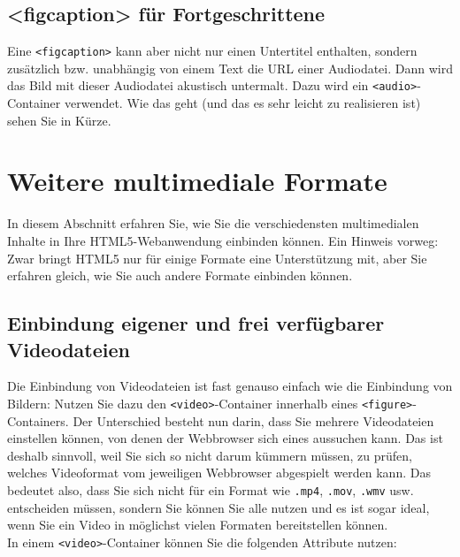 \subsection{<figcaption> für Fortgeschrittene}

Eine \verb|<figcaption>| kann aber nicht nur einen Untertitel enthalten, sondern zusätzlich bzw. unabhängig von einem Text die URL einer Audiodatei. Dann wird das Bild mit dieser Audiodatei akustisch untermalt. Dazu wird ein \verb|<audio>|-Container verwendet. Wie das geht (und das es sehr leicht zu realisieren ist) sehen Sie in Kürze.

\section{Weitere multimediale Formate}

In diesem Abschnitt erfahren Sie, wie Sie die verschiedensten multimedialen Inhalte in Ihre HTML5-Webanwendung einbinden können. Ein Hinweis vorweg: Zwar bringt HTML5 nur für einige Formate eine Unterstützung mit, aber Sie erfahren gleich, wie Sie auch andere Formate einbinden können.

\subsection{Einbindung eigener und frei verfügbarer Videodateien}

Die Einbindung von Videodateien ist fast genauso einfach wie die Einbindung von Bildern: Nutzen Sie dazu den \verb|<video>|-Container innerhalb eines \verb|<figure>|-Containers. Der Unterschied besteht nun darin, dass Sie mehrere Videodateien einstellen können, von denen der Webbrowser sich eines aussuchen kann. Das ist deshalb sinnvoll, weil Sie sich so nicht darum kümmern müssen, zu prüfen, welches Videoformat vom jeweiligen Webbrowser abgespielt werden kann. Das bedeutet also, dass Sie sich nicht für ein Format wie \verb|.mp4|, \verb|.mov|, \verb|.wmv| usw. entscheiden müssen, sondern Sie können Sie alle nutzen und es ist sogar ideal, wenn Sie ein Video in möglichst vielen Formaten bereitstellen können.\\

In einem \verb|<video>|-Container können Sie die folgenden Attribute nutzen:

